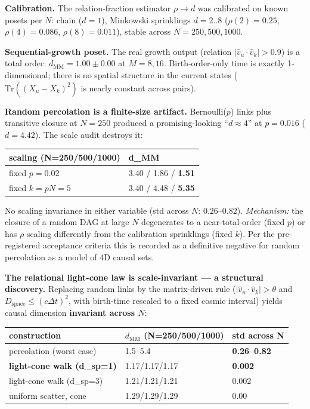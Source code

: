 \documentclass[12pt,a4paper]{article}
\newcounter{none}
\begin{document}
\textbf{Calibration.} The relation-fraction estimator \(\rho \to d\) was
calibrated on known posets per \(N\): chain (\(d{=}1\)), Minkowski
sprinklings \(d{=}2..8\) (\(\rho(2){=}0.25\), \(\rho(4){=}0.086\),
\(\rho(8){=}0.011\)), stable across \(N{=}250,500,1000\).

\textbf{Sequential-growth poset.} The real growth output (relation
\(|\hat v_u\cdot\hat v_k|>0.9\)) is a total order:
\textbf{\(d_{\mathrm{MM}}=1.00\pm0.00\)} at \(M=8,16\). Birth-order-only
time is exactly 1-dimensional; there is no spatial structure in the
current states (\(\mathrm{Tr}((X_u-X_k)^2)\) is nearly constant across
pairs).

\textbf{Random percolation is a finite-size artifact.} Bernoulli(\(p\))
links plus transitive closure at \(N=250\) produced a promising-looking
``\(d\approx4\)'' at \(p=0.016\) (\(d=4.42\)). The scale audit destroys
it:

{\def\LTcaptype{none} %
\begin{longtable}[]{@{}ll@{}}
\toprule\noalign{}
scaling (N=250/500/1000) & d\_MM \\
\midrule\noalign{}
\endhead
\bottomrule\noalign{}
\endlastfoot
fixed \(p=0.02\) & 3.40 / 1.86 / \textbf{1.51} \\
fixed \(k=pN=5\) & 3.40 / 4.48 / \textbf{5.35} \\
\end{longtable}
}

No scaling invariance in either variable (std across \(N\):
\(0.26\)--\(0.82\)). \emph{Mechanism:} the closure of a random DAG at
large \(N\) degenerates to a near-total-order (fixed \(p\)) or has
\(\rho\) scaling differently from the calibration sprinklings (fixed
\(k\)). Per the pre-registered acceptance criteria this is recorded as a
definitive negative for random percolation as a model of 4D causal sets.

\textbf{The relational light-cone law is scale-invariant --- a
structural discovery.} Replacing random links by the matrix-driven rule
(\(|\hat v_u\cdot\hat v_k|>\theta\) and
\(D_{\mathrm{space}}\le(c\Delta t)^2\), with birth-time rescaled to a
fixed cosmic interval) yields causal dimension \textbf{invariant across
\(N\)}:

{\def\LTcaptype{none} %
\begin{longtable}[]{@{}lll@{}}
\toprule\noalign{}
construction & \(d_{\mathrm{MM}}\) (N=250/500/1000) & std across N \\
\midrule\noalign{}
\endhead
\bottomrule\noalign{}
\endlastfoot
percolation (worst case) & 1.5--5.4 & \textbf{0.26--0.82} \\
\textbf{light-cone walk (d\_sp=1)} & 1.17/1.17/1.17 & \textbf{0.002} \\
light-cone walk (d\_sp=3) & 1.21/1.21/1.21 & 0.002 \\
uniform scatter, cone & 1.29/1.29/1.29 & 0.00 \\
\end{longtable}
}
\end{document}
